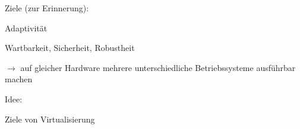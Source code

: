 \documentclass[a4paper]{article}
\begin{document}
\begin{multicols}{3}
    \begin{itemize*}
        \item
        Ziele (zur Erinnerung):
        \begin{itemize*}
            \item Adaptivität
            \item Wartbarkeit, Sicherheit, Robustheit
            \item[$\rightarrow$] auf gleicher Hardware mehrere unterschiedliche Betriebssysteme ausführbar machen
        \end{itemize*}
        \item
        Idee:
    \end{itemize*}

    Ziele von Virtualisierung


\end{multicols}
\end{document}
